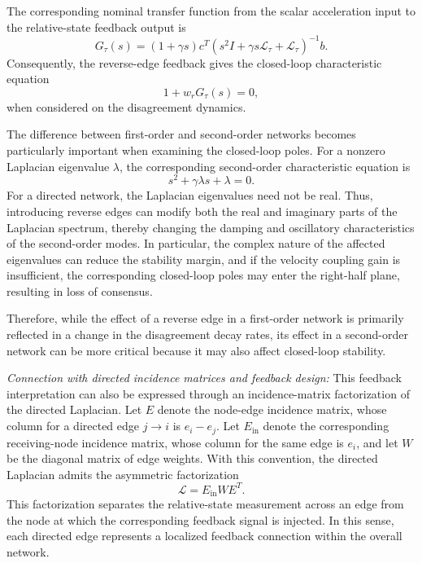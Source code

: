 \documentclass[11pt,a4paper]{article}
\begin{document}
The corresponding nominal transfer function from the scalar acceleration input to the relative-state feedback output is
\begin{equation}
G_{\tau}(s)
=(1+\gamma s)c^T
\left(s^2I+\gamma s\mathcal{L}_{\tau}+\mathcal{L}_{\tau}\right)^{-1}b.
\label{eq:second_order_feedback_tf}
\end{equation}
Consequently, the reverse-edge feedback gives the closed-loop characteristic equation
\begin{equation}
1+w_rG_{\tau}(s)=0,
\label{eq:reverse_edge_feedback_second_order}
\end{equation}
when considered on the disagreement dynamics.

The difference between first-order and second-order networks becomes particularly important when examining the closed-loop poles. For a nonzero Laplacian eigenvalue $\lambda$, the corresponding second-order characteristic equation is
\begin{equation}
s^2+\gamma\lambda s+\lambda=0.
\end{equation}
For a directed network, the Laplacian eigenvalues need not be real. Thus, introducing reverse edges can modify both the real and imaginary parts of the Laplacian spectrum, thereby changing the damping and oscillatory characteristics of the second-order modes. In particular, the complex nature of the affected eigenvalues can reduce the stability margin, and if the velocity coupling gain is insufficient, the corresponding closed-loop poles may enter the right-half plane, resulting in loss of consensus.

Therefore, while the effect of a reverse edge in a first-order network is primarily reflected in a change in the disagreement decay rates, its effect in a second-order network can be more critical because it may also affect closed-loop stability.

\textit{Connection with directed incidence matrices and feedback design:}
This feedback interpretation can also be expressed through an incidence-matrix factorization of the directed Laplacian. Let $E$ denote the node-edge incidence matrix, whose column for a directed edge $j\rightarrow i$ is $e_i-e_j$. Let $E_{\mathrm{in}}$ denote the corresponding receiving-node incidence matrix, whose column for the same edge is $e_i$, and let $W$ be the diagonal matrix of edge weights. With this convention, the directed Laplacian admits the asymmetric factorization
\begin{equation}
\mathcal{L}=E_{\mathrm{in}}WE^T.
\label{eq:directed_laplacian_factorization}
\end{equation}
This factorization separates the relative-state measurement across an edge from the node at which the corresponding feedback signal is injected. In this sense, each directed edge represents a localized feedback connection within the overall network.
\end{document}
